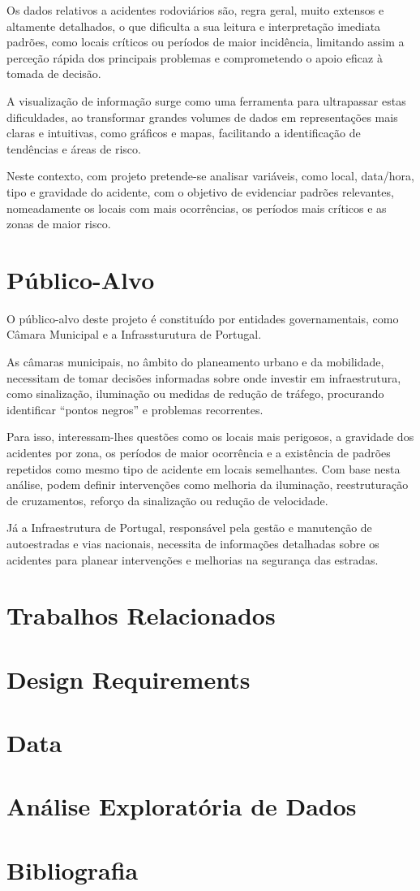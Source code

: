 \documentclass[a4paper, 12pt]{article}
\begin{document}
Os dados relativos a acidentes rodoviários são, regra geral, muito extensos e altamente detalhados, o que dificulta a sua leitura e interpretação imediata padrões, como locais críticos ou períodos de maior incidência, limitando assim a perceção rápida dos principais problemas e comprometendo o apoio eficaz à tomada de decisão. 

A visualização de informação surge como uma ferramenta para ultrapassar estas dificuldades, ao transformar grandes volumes de dados em representações mais claras e intuitivas, como gráficos e mapas, facilitando a identificação de tendências e áreas de risco.

Neste contexto, com projeto pretende-se analisar variáveis, como local, data/hora, tipo e gravidade do acidente, com o objetivo de evidenciar padrões relevantes, nomeadamente os locais com mais ocorrências, os períodos mais críticos e as zonas de maior risco.


\section{Público-Alvo}
O público-alvo deste projeto é constituído por entidades governamentais, como Câmara Municipal e a Infrassturutura de Portugal.

As câmaras municipais, no âmbito do planeamento urbano e da mobilidade, necessitam de tomar decisões informadas sobre onde investir em infraestrutura, como sinalização, iluminação ou medidas de redução de tráfego, procurando identificar “pontos negros” e problemas recorrentes.

Para isso, interessam-lhes questões como os locais mais perigosos, a gravidade dos acidentes por zona, os períodos de maior ocorrência e a existência de padrões repetidos como mesmo tipo de acidente em locais semelhantes. Com base nesta análise, podem definir intervenções como melhoria da iluminação, reestruturação de cruzamentos, reforço da sinalização ou redução de velocidade.

Já a Infraestrutura de Portugal, responsável pela gestão e manutenção de autoestradas e vias nacionais, necessita de informações detalhadas sobre os acidentes para planear intervenções e melhorias na segurança das estradas. 

\section{Trabalhos Relacionados}
\section{Design Requirements}
\section{Data}
\section{Análise Exploratória de Dados}



\newpage

\section*{Bibliografia} %

\nocite{*}


\end{document}

